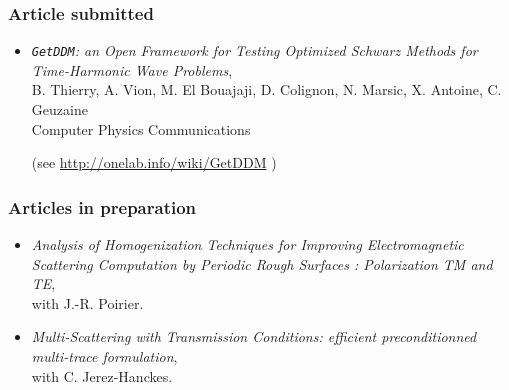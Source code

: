 \documentclass[a4paper,10pt,twoside]{article}
\begin{document}
\subsubsection*{Article submitted}
\begin{itemize}
\item[\textbullet]
  \emph{\texttt{GetDDM}: an Open Framework for Testing Optimized Schwarz
    Methods for Time-Harmonic Wave Problems},\\
  B. Thierry, A. Vion, M. El Bouajaji,
  D. Colignon, N. Marsic, X. Antoine, C. Geuzaine\\
  \textsf{Computer Physics Communications}
  \begin{flushright}
    (see \url{http://onelab.info/wiki/GetDDM} )
  \end{flushright}
\end{itemize}

\vspace{-0.25cm}

\subsubsection*{Articles in preparation}
\begin{itemize}
\item[\textbullet]
\emph{Analysis of
  Homogenization Techniques for Improving Electromagnetic Scattering
  Computation by Periodic Rough Surfaces : Polarization TM and TE},\\
with \textsf{J.-R. Poirier}.
\item[\textbullet]
  \emph{Multi-Scattering with Transmission Conditions: efficient
    preconditionned multi-trace formulation},\\
  with \textsf{C. Jerez-Hanckes}.
\end{itemize}

\vspace{-0.25cm}
\end{document}
